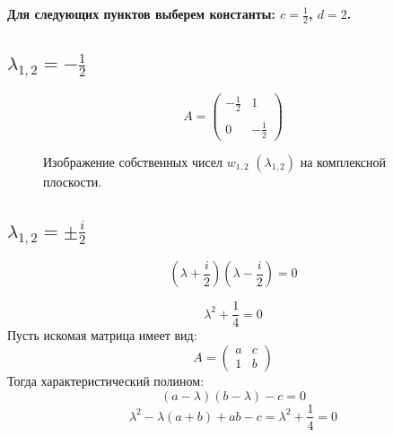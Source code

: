 \documentclass[a5paper, 10pt]{article}
\theoremstyle{definition}
\theoremstyle{plain}
\theoremstyle{remark}
\begin{document}
\newpage
\textbf{Для следующих пунктов выберем константы: $c = \frac{1}{2}$, $d = 2$.}
\\

\subsection{$\lambda_{1, 2} = -\frac{1}{2}$}

\begin{equation}
A =
\begin{pmatrix}
 -\frac{1}{2} &  1\\
\\
0 &  -\frac{1}{2}
\end{pmatrix}
\end{equation}
\begin{figure}[h!]
\caption{Изображение собственных чисел $w_{1, 2} \, \, \left( \lambda_{1, 2} \right)$ на комплексной плоскости.}
\end{figure}

\subsection{$\lambda_{1, 2} = \pm \frac{i}{2}$}

\begin{equation}
\left( \lambda +  \frac{i}{2} \right)\left( \lambda - \frac{i}{2} \right)=0
\end{equation}

\begin{equation}
\lambda^2 +  \frac{1}{4} =0
\end{equation}
Пусть искомая матрица имеет вид:
\begin{equation}
A =
\begin{pmatrix}
a & c \\
1 & b
\end{pmatrix}
\end{equation}
Тогда характеристический полином:
\begin{equation}
\left( a - \lambda \right) \left( b - \lambda \right) - c = 0
\end{equation}
\begin{equation}
\lambda^ 2 - \lambda (a + b ) + ab - c = \lambda^2 +  \frac{1}{4} =0
\end{equation}
\end{document}
